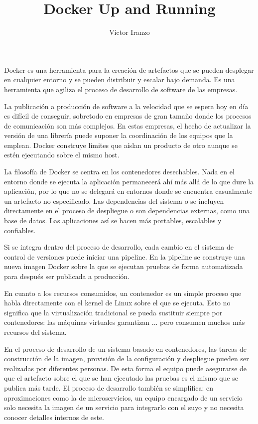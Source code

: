 \documentclass[11pt,a4paper]{article}
\author{Víctor Iranzo}
\title{Docker Up and Running}
\begin{document}
\maketitle

Docker es una herramienta para la creación de artefactos que se pueden desplegar en cualquier entorno y se pueden distribuir y escalar bajo demanda. Es una herramienta que agiliza el proceso de desarrollo de software de las empresas.

La publicación a producción de software a la velocidad que se espera hoy en día es difícil de conseguir, sobretodo en empresas de gran tamaño donde los procesos de comunicación son más complejos. En estas empresas, el hecho de actualizar la versión de una librería puede suponer la coordinación de los equipos que la emplean. Docker construye límites que aíslan un producto de otro aunque se estén ejecutando sobre el mismo host.

La filosofía de Docker se centra en los contenedores desechables. Nada en el entorno donde se ejecuta la aplicación permanecerá ahí más allá de lo que dure la aplicación, por lo que no se delegará en entornos donde se encuentra casualmente un artefacto no especificado. Las dependencias del sistema o se incluyen directamente en el proceso de despliegue o son dependencias externas, como una base de datos.  Las aplicaciones así se hacen más portables, escalables y confiables.

Si se integra dentro del proceso de desarrollo, cada cambio en el sistema de control de versiones puede iniciar una pipeline. En la pipeline se construye una nueva imagen Docker sobre la que se ejecutan pruebas de forma automatizada para después ser publicada a producción.

En cuanto a los recursos consumidos, un contenedor es un simple proceso que habla directamente con el kernel de Linux sobre el que se ejecuta. Esto no significa que la virtualización tradicional se pueda sustituir siempre por contenedores: las máquinas virtuales garantizan ... pero consumen muchos más recursos del sistema.

En el proceso de desarrollo de un sistema basado en contenedores, las tareas de construcción de la imagen, provisión de la configuración y despliegue pueden ser realizadas por diferentes personas. De esta forma el equipo puede asegurarse de que el artefacto sobre el que se han ejecutado las pruebas es el mismo que se publica más tarde. El proceso de desarrollo también se simplifica: en aproximaciones como la de microservicios, un equipo encargado de un servicio solo necesita la imagen de un servicio para integrarlo con el suyo y no necesita conocer detalles internos de este. 
\end{document}
